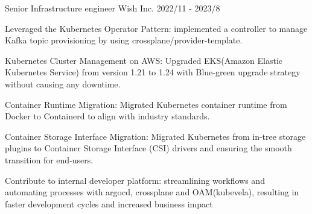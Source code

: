 

\begin{cventries}

\cventry
  {Senior Infrastructure engineer} %
  {Wish Inc.} %
  {} %
  {2022/11 - 2023/8} %
  {
    \begin{cvitems} %
      \item {Leveraged the Kubernetes Operator Pattern: implemented a controller to manage Kafka topic provisioning by using crossplane/provider-template.}
      \item {Kubernetes Cluster Management on AWS: Upgraded EKS(Amazon Elastic Kubernetes Service) from version 1.21 to 1.24 with Blue-green upgrade strategy without causing any downtime.}
      \item {Container Runtime Migration: Migrated Kubernetes container runtime from Docker to Containerd to align with industry standards.}
      \item {Container Storage Interface Migration: Migrated Kubernetes from in-tree storage plugins to Container Storage Interface (CSI) drivers and ensuring the smooth transition for end-users. }
      \item {Contribute to internal developer platform: streamlining workflows and automating processes with argocd, crossplane and OAM(kubevela), resulting in faster development cycles and increased business impact}
    \end{cvitems}
  }


\end{cventries}
